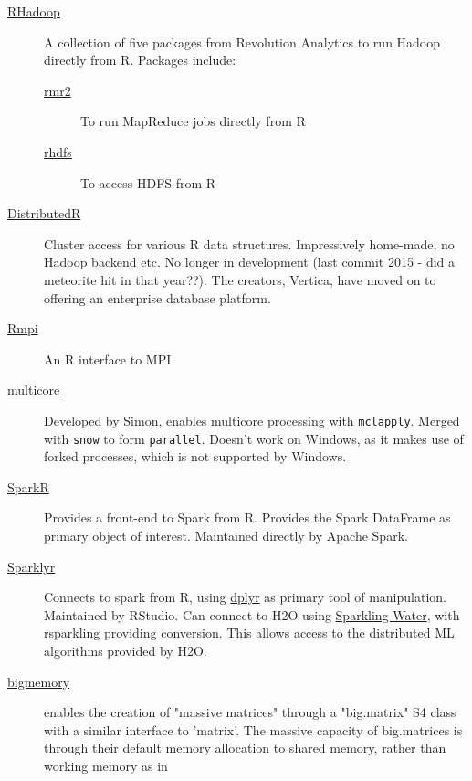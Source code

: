 \documentclass[a4paper, 11pt]{article}
\begin{document}
\begin{description}
\item[{\href{https://github.com/RevolutionAnalytics/RHadoop/wiki}{RHadoop}}] A collection of five packages from Revolution Analytics
to run Hadoop directly from R. Packages include:
\begin{description}
\item[{\href{https://github.com/RevolutionAnalytics/rmr2}{rmr2}}] To run MapReduce jobs directly from R
\item[{\href{https://github.com/RevolutionAnalytics/rhdfs}{rhdfs}}] To access HDFS from R
\end{description}
\item[{\href{https://github.com/vertica/DistributedR}{DistributedR}}] Cluster access for various R data structures.
Impressively home-made, no Hadoop backend etc. No longer in
development (last commit 2015 - did a meteorite hit in that
year??). The creators, Vertica, have moved on to offering an
enterprise database platform.
\item[{\href{https://cran.r-project.org/web/packages/Rmpi/index.html}{Rmpi}}] An R interface to MPI
\item[{\href{https://www.rforge.net/doc/packages/multicore/multicore.html}{multicore}}] Developed by Simon, enables multicore processing with
\texttt{mclapply}. Merged with \texttt{snow} to form \texttt{parallel}.
Doesn't work on Windows, as it makes use of forked
processes, which is not supported by Windows.
\item[{\href{https://spark.apache.org/docs/latest/sparkr.html}{SparkR}}] Provides a front-end to Spark from R. Provides the Spark
DataFrame as primary object of interest. Maintained directly by
Apache Spark.
\item[{\href{https://spark.rstudio.com/}{Sparklyr}}] Connects to spark from R, using \href{https://dplyr.tidyverse.org/index.html}{dplyr} as primary tool of
manipulation. Maintained by RStudio. Can connect to H2O using
\href{https://github.com/h2oai/sparkling-water/tree/master/r}{Sparkling Water}, with \href{https://github.com/h2oai/rsparkling}{rsparkling} providing conversion. This
allows access to the distributed ML algorithms provided by H2O.
\item[{\href{https://github.com/kaneplusplus/bigmemory}{bigmemory}}] enables the creation of "massive matrices" through a
"big.matrix" S4 class with a similar interface to 'matrix'. The
massive capacity of big.matrices is through their default memory
allocation to shared memory, rather than working memory as in

\end{description}
\end{document}
